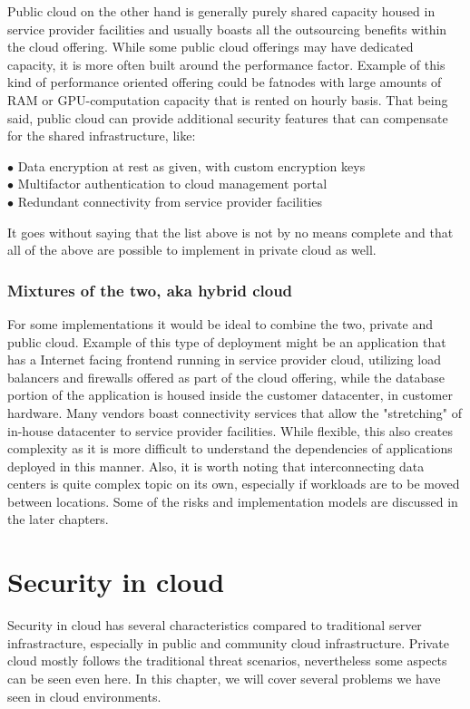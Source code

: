 \documentclass{article}
\begin{document}
\par
Public cloud on the other hand is generally purely shared capacity housed in service provider facilities and usually boasts all the outsourcing benefits within the cloud offering. While some public cloud offerings may have dedicated capacity, it is more often built around the performance factor. Example of this kind of performance oriented offering could be fatnodes with large amounts of RAM or GPU-computation capacity that is rented on hourly basis. That being said, public cloud can provide additional security features that can compensate for the shared infrastructure, like:
\begin{description}
	\item[$\bullet$ Data encryption at rest as given, with custom encryption keys]
	\item[$\bullet$ Multifactor authentication to cloud management portal]
	\item[$\bullet$ Redundant connectivity from service provider facilities]
\end{description}
It goes without saying that the list above is not by no means complete and that all of the above are possible to implement in private cloud as well.
\subsubsection{Mixtures of the two, aka hybrid cloud}
For some implementations it would be ideal to combine the two, private and public cloud. Example of this type of deployment might be an application that has a Internet facing frontend running in service provider cloud, utilizing load balancers and firewalls offered as part of the cloud offering, while the database portion of the application is housed inside the customer datacenter, in customer hardware. Many vendors boast connectivity services that allow the "stretching" of in-house datacenter to service provider facilities. While flexible, this also creates complexity as it is more difficult to understand the dependencies of applications deployed in this manner. Also, it is worth noting that interconnecting data centers is quite complex topic on its own, especially if workloads are to be moved between locations. Some of the risks and implementation models are discussed in the later chapters.
\section{Security in cloud}
Security in cloud has several characteristics compared to traditional server infrastracture, especially in public and community cloud infrastructure. Private cloud mostly follows the traditional threat scenarios, nevertheless some aspects can be seen even here. In this chapter, we will cover several problems we have seen in cloud environments.
\end{document}
